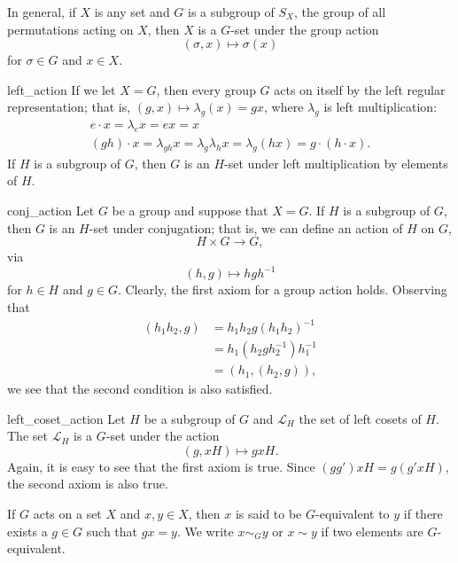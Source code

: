 In general, if $X$ is any set and $G$ is a subgroup of $S_X$, the
group of all permutations acting on $X$, then $X$ is a $G$-set under
the group action 
\[
(\sigma, x) \mapsto \sigma(x)
\]
for $\sigma \in G$ and $x \in X$.
 
 
\begin{example}{left_action}
If we let $X = G$, then every group $G$ acts on itself by the left
regular representation; that is, $(g,x) \mapsto \lambda_g(x) = gx$, 
where  $\lambda_g$ is left multiplication:
\begin{gather*}
e \cdot x = \lambda_e x = ex = x \\
(gh) \cdot x = \lambda_{gh}x = \lambda_g \lambda_h x =
\lambda_g(hx) = g \cdot ( h \cdot x).
\end{gather*}
If $H$ is a subgroup of $G$, then $G$ is an $H$-set under left
multiplication by elements of $H$. 
\end{example}
 
 
\begin{example}{conj_action}
Let $G$ be a group and suppose that $X=G$. If $H$ is a subgroup of
$G$, then $G$ is an $H$-set under {\bfi
conjugation}; that is, we can define an action of
$H$ on $G$, 
\[
H \times G \rightarrow G,
\]
via
\[
(h,g) \mapsto hgh^{-1}
\]
for $h \in H$ and $g \in G$.  Clearly, the first axiom for a group
action holds.  Observing that 
\begin{align*}
(h_1 h_2, g) 
& = h_1 h_2 g (h_1 h_2 )^{-1} \\
& = h_1( h_2 g h_2^{-1}) h_1^{-1} \\
& =  (h_1, (h_2, g) ),
\end{align*}
we see that the second condition is also satisfied.
\end{example}
 
 
\begin{example}{left_coset_action}
Let $H$ be a subgroup of $G$ and ${\mathcal L}_H$ the set of left cosets
of $H$.  The set ${\mathcal L}_H$ is a $G$-set under the action
\[
(g, xH) \mapsto gxH.
\]
Again, it is easy to see that the first axiom is true. Since $(g g')xH
= g( g'x H)$, the second axiom is  also true.
\end{example}
 
 
 
If $G$ acts on a set $X$ and $x, y \in X$, then $x$ is said to be
{\bfi  $G$-equivalent\/} to $y$ if there exists a
$g \in G$ such that $gx =y$. We  write $x \sim_G y$ or $x \sim y$ if
two elements are $G$-equivalent. 
 
